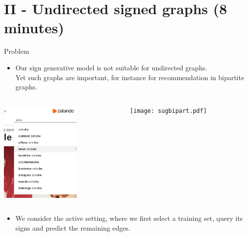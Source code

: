 \documentclass[10pt,svgnames,ignorenonframetext,final]{beamer}
\providecommand{\tightlist}{%
  \setlength{\itemsep}{0pt}\setlength{\parskip}{0pt}}
\begin{document}
\section{II - Undirected signed graphs (8 minutes)}
\label{ii---undirected-signed-graphs-8-minutes}

\begin{frame}{Problem}

\begin{itemize}
\tightlist
\item
  Our sign generative model is not suitable for undirected graphs.\\
  Yet such graphs are important, for instance for recommendation in
  bipartite graphs.
\end{itemize}

\begin{columns}[T] %
\begin{column}{.49\textwidth}
\includegraphics[height=5cm]{suggestions.png}
\end{column}%
\hfill%
\begin{column}{.49\textwidth}
\texttt{[image: sugbipart.pdf]}
\end{column}%
\end{columns}

\begin{itemize}
\tightlist
\item
  We consider the active setting, where we first select a training set,
  query its signs and predict the remaining edges.
\end{itemize}

\end{frame}
\end{document}
